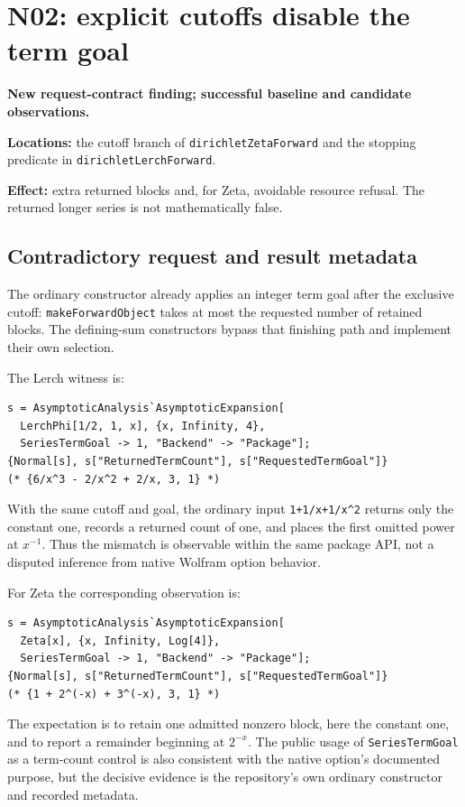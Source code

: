 \documentclass[11pt,letterpaper]{article}
\newcommand{\code}[1]{\nolinkurl{#1}}
\begin{document}
\section{N02: explicit cutoffs disable the term goal}
\begin{finding}
\textbf{New request-contract finding; successful baseline and candidate observations.}\par
\textbf{Locations:} the cutoff branch of \code{dirichletZetaForward} and the
stopping predicate in \code{dirichletLerchForward}.\par
\textbf{Effect:} extra returned blocks and, for Zeta, avoidable resource refusal.
The returned longer series is not mathematically false.
\end{finding}

\subsection{Contradictory request and result metadata}
The ordinary constructor already applies an integer term goal after the
exclusive cutoff: \code{makeForwardObject} takes at most the requested number
of retained blocks. The defining-sum constructors bypass that finishing path
and implement their own selection.~\cite{core,dirichlet}

The Lerch witness is:
\begin{lstlisting}
s = AsymptoticAnalysis`AsymptoticExpansion[
  LerchPhi[1/2, 1, x], {x, Infinity, 4},
  SeriesTermGoal -> 1, "Backend" -> "Package"];
{Normal[s], s["ReturnedTermCount"], s["RequestedTermGoal"]}
(* {6/x^3 - 2/x^2 + 2/x, 3, 1} *)
\end{lstlisting}
With the same cutoff and goal, the ordinary input
\code{1+1/x+1/x^2} returns only the constant one, records a returned count of
one, and places the first omitted power at $x^{-1}$. Thus the mismatch is
observable within the same package API, not a disputed inference from native
Wolfram option behavior.

For Zeta the corresponding observation is:
\begin{lstlisting}
s = AsymptoticAnalysis`AsymptoticExpansion[
  Zeta[x], {x, Infinity, Log[4]},
  SeriesTermGoal -> 1, "Backend" -> "Package"];
{Normal[s], s["ReturnedTermCount"], s["RequestedTermGoal"]}
(* {1 + 2^(-x) + 3^(-x), 3, 1} *)
\end{lstlisting}
The expectation is to retain one admitted nonzero block, here the constant one,
and to report a remainder beginning at $2^{-x}$. The public usage of
\code{SeriesTermGoal} as a term-count control is also consistent with the
native option's documented purpose, but the decisive evidence is the
repository's own ordinary constructor and recorded metadata.~\cite{wl-goal,core}
\end{document}
